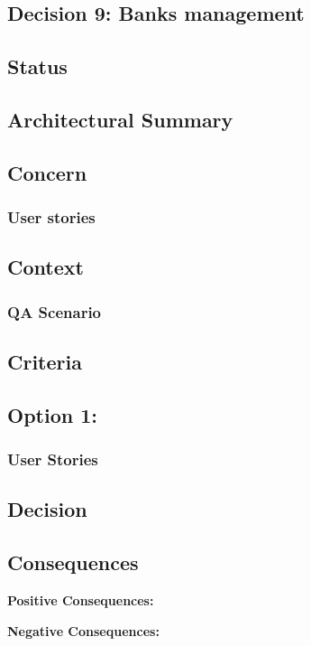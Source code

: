 \subsection{Decision 9: Banks management}

\subsection*{Status}

\subsection*{Architectural Summary}


\subsection*{Concern}
\subsubsection*{User stories}

\subsection*{Context}
\subsubsection*{QA Scenario} %
\subsection*{Criteria}
\begin{itemize}
\end{itemize}

\subsection*{Option 1: }
\subsubsection*{User Stories}
\subsection*{Decision}
\subsection*{Consequences}
\textbf{Positive Consequences:}
\begin{itemize}
\end{itemize}
\textbf{Negative Consequences:}
\begin{itemize}
\end{itemize}